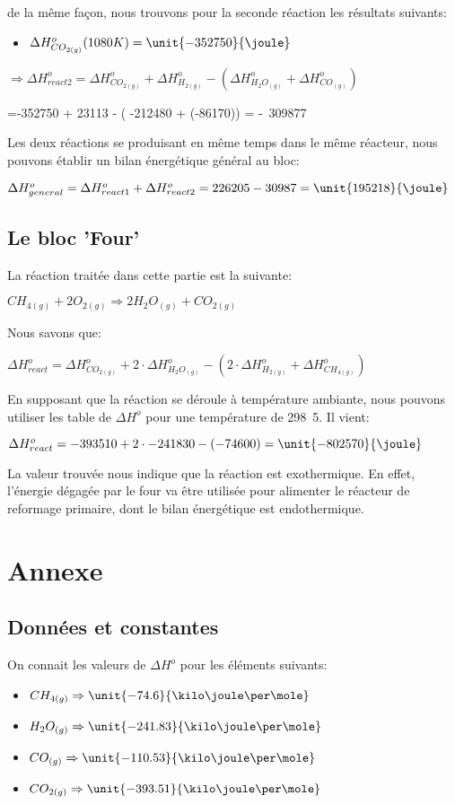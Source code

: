 \documentclass[11pt,a4paper]{report}
\begin{document}
de la même façon, nous trouvons pour la seconde réaction les résultats suivants:

\begin{itemize}
\item{$\Delta H^o_{CO_{2(g)}} (1080K)= \unit{-352750}{\joule}$}
\end{itemize}
$\Rightarrow \Delta H^o_{react2}= \Delta H^o_{CO_{2(g)}} + \Delta H^o_{H_{2(g)}} -(\Delta H^o_{H_{2}O_{(g)}} + \Delta H^o_{CO_{(g)}})$

=-352750 + 23113 - ( -212480 + (-86170)) = \unit{-30987}{\joule}7

Les deux réactions se produisant en même temps dans le même réacteur, nous pouvons établir un bilan énergétique 
général au bloc:


$\Delta H^o_{general}= \Delta H^o_{react1} + \Delta H^o_{react2} = 226205 - 30987 = \unit{195218}{\joule}$

\subsection*{Le bloc 'Four'}
La réaction traitée dans cette partie est la suivante:

$CH_{4(g)} + 2O_{2(g)} \Rightarrow 2H_{2}O_{(g)} + CO_{2(g)}$

Nous savons que:

$\Delta H^o_{react} = \Delta H^o_{CO_{2(g)}} + 2\cdot \Delta H^o_{H_{2}O_{(g)}} - (2\cdot \Delta H^o_{H_{2(g)}} + \Delta H^o_{CH_{4(g)}}) $

En supposant que la réaction se déroule à température ambiante, nous pouvons utiliser les table de $\Delta H^o$ pour une
température de \unit{298.5}{\kelvin}. Il vient:

$\Delta H^o_{react} = -393510 + 2\cdot -241830 - (-74600) = \unit{-802570}{\joule}$

La valeur trouvée nous indique que la réaction est exothermique. En effet, l'énergie dégagée par le four va être 
utilisée pour alimenter le réacteur de reformage primaire, dont le bilan énergétique est endothermique.
\section*{Annexe}
\subsection*{Données et constantes}
On connait les valeurs de $\Delta H^o$ pour les éléments suivants:
\begin{itemize}
\item{$CH_{4(g)} \Rightarrow \unit{-74.6}{\kilo\joule\per\mole}$}
\item{$H_2O_{(g)} \Rightarrow \unit{-241.83}{\kilo\joule\per\mole}$}
\item{$CO_{(g)} \Rightarrow \unit{-110.53}{\kilo\joule\per\mole}$}
\item{$CO_{2(g)} \Rightarrow \unit{-393.51}{\kilo\joule\per\mole}$}
\end{itemize}
\end{document}
